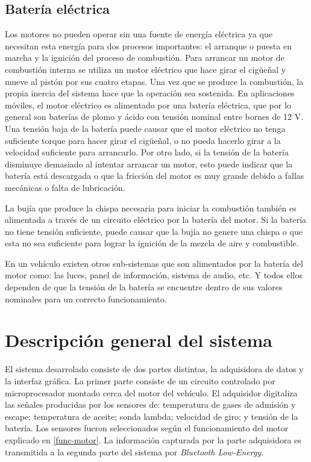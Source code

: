 \subsection{Batería eléctrica}
Los motores no pueden operar sin una fuente de energía eléctrica ya que necesitan esta energía para dos procesos importantes: el arranque o puesta en marcha y la ignición del proceso de combustión.
Para arrancar un motor de combustión interna se utiliza un motor eléctrico que hace girar el cigüeñal y mueve al pistón por sus cuatro etapas. Una vez que se produce la combustión, la propia inercia del sistema hace que la operación sea sostenida. En aplicaciones móviles, el motor eléctrico es alimentado por una batería eléctrica, que por lo general son baterías de plomo y ácido con tensión nominal entre bornes de 12 V. Una tensión baja de la batería puede causar que el motor eléctrico no tenga suficiente torque para hacer girar el cigüeñal, o no pueda hacerlo girar a la velocidad suficiente para arrancarlo. Por otro lado, si la tensión de la batería disminuye demasiado al intentar arrancar un motor, esto puede indicar que la batería está descargada o que la fricción del motor es muy grande debido a fallas mecánicas o falta de lubricación.

La bujía que produce la chispa necesaria para iniciar la combustión también es alimentada a través de un circuito eléctrico por la batería del motor. Si la batería no tiene tensión suficiente, puede causar que la bujía no genere una chispa o que esta no sea suficiente para lograr la ignición de la mezcla de aire y combustible.

En un vehículo existen otros sub-sistemas que son alimentados por la batería del motor como: las luces, panel de información, sistema de audio, etc. Y todos ellos dependen de que la tensión de la batería se encuentre dentro de sus valores nominales para un correcto funcionamiento.

\section{Descripción general del sistema}

El sistema desarrolado consiste de dos partes distintas, la adquisidora de datos y la interfaz gráfica. La primer parte consiste de un circuito controlado por microprocesador montado cerca del motor del vehículo. El adquisidor digitaliza las señales producidas por los sensores de: temperatura de gases de admisión y escape; temperatura de aceite; sonda lambda; velocidad de giro; y tensión de la batería. Los sensores fueron seleccionados según el funcionamiento del motor explicado en \ref{func-motor}.  La información capturada por la parte adquisidora es transmitida a la segunda parte del sistema por \textit{Bluetooth Low-Energy}.

